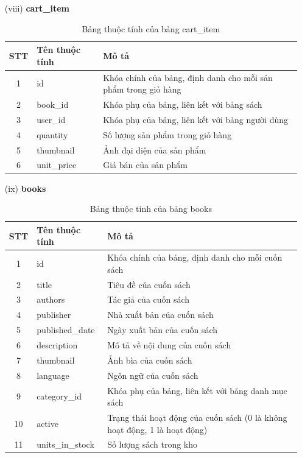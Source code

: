 \documentclass[../DoAn.tex]{subfiles}
\begin{document}
\begin{enumerate}
    \item[(viii)] \textbf{cart\_item}
    \begin{table}[H]
    \centering
        \begin{tabular}{|c|m{4cm}|m{8cm}|}
        \hline
        \textbf{STT} & \textbf{Tên thuộc tính} & \textbf{Mô tả} \\
        \hline
        1 & id & Khóa chính của bảng, định danh cho mỗi sản phẩm trong giỏ hàng \\
        \hline
        2 & book\_id & Khóa phụ của bảng, liên kết với bảng sách \\
        \hline
        3 & user\_id & Khóa phụ của bảng, liên kết với bảng người dùng \\
        \hline
        4 & quantity & Số lượng sản phẩm trong giỏ hàng \\
        \hline
        5 & thumbnail & Ảnh đại diện của sản phẩm \\
        \hline
        6 & unit\_price & Giá bán của sản phẩm \\
        \hline
        \end{tabular}
        \caption{Bảng thuộc tính của bảng cart\_item}
        \label{tab:cart_item_attributes}
    \end{table}

    \item[(ix)] \textbf{books}
    \begin{table}[H]
    \centering
        \begin{tabular}{|c|m{4cm}|m{8cm}|}
        \hline
        \textbf{STT} & \textbf{Tên thuộc tính} & \textbf{Mô tả} \\
        \hline
        1 & id & Khóa chính của bảng, định danh cho mỗi cuốn sách \\
        \hline
        2 & title & Tiêu đề của cuốn sách \\
        \hline
        3 & authors & Tác giả của cuốn sách \\
        \hline
        4 & publisher & Nhà xuất bản của cuốn sách \\
        \hline
        5 & published\_date & Ngày xuất bản của cuốn sách \\
        \hline
        6 & description & Mô tả về nội dung của cuốn sách \\
        \hline
        7 & thumbnail & Ảnh bìa của cuốn sách \\
        \hline
        8 & language & Ngôn ngữ của cuốn sách \\
        \hline
        9 & category\_id & Khóa phụ của bảng, liên kết với bảng danh mục sách \\
        \hline
        10 & active & Trạng thái hoạt động của cuốn sách (0 là không hoạt động, 1 là hoạt động) \\
        \hline
        11 & units\_in\_stock & Số lượng sách trong kho \\
        \hline
        \end{tabular}
        \caption{Bảng thuộc tính của bảng books}
        \label{tab:books_attributes}
    \end{table}


\end{enumerate}
\end{document}
